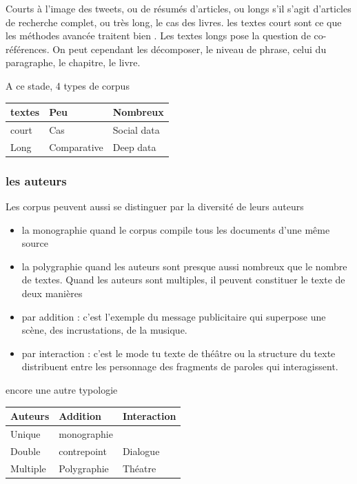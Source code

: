\documentclass[
  letterpaper,
  DIV=11,
  numbers=noendperiod]{scrreprt}
\begin{document}
Courts à l'image des tweets, ou de résumés d'articles, ou longs s'il
s'agit d'articles de recherche complet, ou très long, le cas des livres.
les textes court sont ce que les méthodes avancée traitent bien . Les
textes longs pose la question de co-références. On peut cependant les
décomposer, le niveau de phrase, celui du paragraphe, le chapitre, le
livre.

A ce stade, 4 types de corpus

\begin{longtable}[]{@{}lll@{}}
\toprule\noalign{}
textes & Peu & Nombreux \\
\midrule\noalign{}
\endhead
\bottomrule\noalign{}
\endlastfoot
court & Cas & Social data \\
Long & Comparative & Deep data \\
\end{longtable}

\subsubsection{les auteurs}\label{les-auteurs}

Les corpus peuvent aussi se distinguer par la diversité de leurs auteurs

\begin{itemize}
\item
  la monographie quand le corpus compile tous les documents d'une même
  source
\item
  la polygraphie quand les auteurs sont presque aussi nombreux que le
  nombre de textes. Quand les auteurs sont multiples, il peuvent
  constituer le texte de deux manières
\item
  par addition : c'est l'exemple du message publicitaire qui superpose
  une scène, des incrustations, de la musique.
\item
  par interaction : c'est le mode tu texte de théâtre ou la structure du
  texte distribuent entre les personnage des fragments de paroles qui
  interagissent.
\end{itemize}

encore une autre typologie

\begin{longtable}[]{@{}lll@{}}
\toprule\noalign{}
Auteurs & Addition & Interaction \\
\midrule\noalign{}
\endhead
\bottomrule\noalign{}
\endlastfoot
Unique & monographie & \\
Double & contrepoint & Dialogue \\
Multiple & Polygraphie & Théatre \\
\end{longtable}
\end{document}
